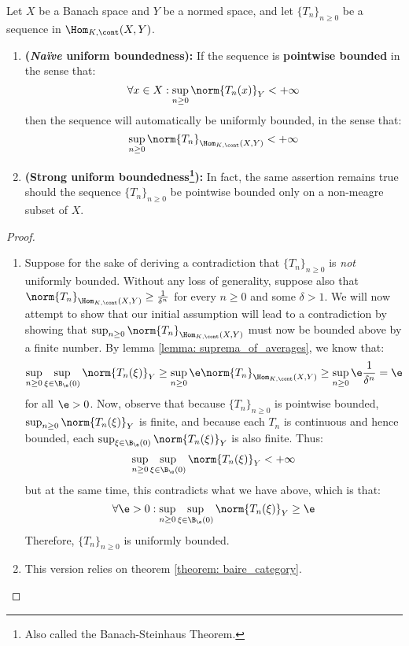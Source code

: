         \begin{theorem} \label{theorem: uniform_boundedness}
            Let $X$ be a Banach space and $Y$ be a normed space, and let $\{T_n\}_{n \geq 0}$ be a sequence in $\Hom_{K, \cont}(X, Y)$.
            \begin{enumerate}
                \item \textbf{(\textit{Na\"ive} uniform boundedness):} If the sequence is \textbf{pointwise bounded} in the sense that:
                    $$\forall x \in X: \sup_{n \geq 0} \norm{ T_n(x) }_Y < +\infty$$
                then the sequence will automatically be uniformly bounded, in the sense that:
                    $$\sup_{n \geq 0} \norm{T_n}_{\Hom_{K, \cont}(X, Y)} < +\infty$$
                \item \textbf{(Strong uniform boundedness\footnote{Also called the Banach-Steinhaus Theorem.}):} In fact, the same assertion remains true should the sequence $\{T_n\}_{n \geq 0}$ be pointwise bounded only on a non-meagre subset of $X$. 
            \end{enumerate}
        \end{theorem}
            \begin{proof}
                \begin{enumerate}
                    \item Suppose for the sake of deriving a contradiction that $\{T_n\}_{n \geq 0}$ is \textit{not} uniformly bounded. Without any loss of generality, suppose also that $\norm{T_n}_{\Hom_{K, \cont}(X, Y)} \geq \frac{1}{\delta^n}$ for every $n \geq 0$ and some $\delta > 1$. We will now attempt to show that our initial assumption will lead to a contradiction by showing that $\sup_{n \geq 0} \norm{T_n}_{\Hom_{K, \cont}(X, Y)}$ must now be bounded above by a finite number. By lemma \ref{lemma: suprema_of_averages}, we know that:
                        $$\sup_{n \geq 0} \sup_{\xi \in \B_{\e}(0)} \norm{T_n(\xi)}_Y \geq \sup_{n \geq 0} \e \norm{T_n}_{\Hom_{K, \cont}(X, Y)} \geq \sup_{n \geq 0} \e \frac{1}{\delta^n} = \e$$
                    for all $\e > 0$. Now, observe that because $\{T_n\}_{n \geq 0}$ is pointwise bounded, $\sup_{n \geq 0} \norm{T_n(\xi)}_Y$ is finite, and because each $T_n$ is continuous and hence bounded, each $\sup_{\xi \in \B_{\e}(0)} \norm{T_n(\xi)}_Y$ is also finite. Thus:
                        $$\sup_{n \geq 0} \sup_{\xi \in \B_{\e}(0)} \norm{T_n(\xi)}_Y < +\infty$$
                    but at the same time, this contradicts what we have above, which is that:
                        $$\forall \e > 0: \sup_{n \geq 0} \sup_{\xi \in \B_{\e}(0)} \norm{T_n(\xi)}_Y \geq \e$$
                    Therefore, $\{T_n\}_{n \geq 0}$ is uniformly bounded.
                    \item This version relies on theorem \ref{theorem: baire_category}. 
                \end{enumerate}
            \end{proof}

